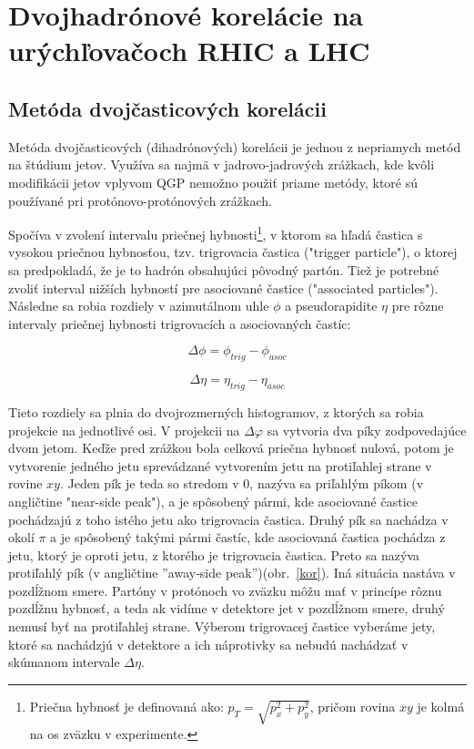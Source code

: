 \documentclass[thesismargins, thesislinespacing]{rnthesis}
\begin{document}
\chapter{Dvojhadrónové korelácie na urýchľovačoch RHIC a LHC}

\section{Metóda dvojčasticových korelácii}
Metóda dvojčasticových (dihadrónových) korelácii je jednou z nepriamych metód na štúdium jetov. Využíva sa najmä v jadrovo-jadrových zrážkach, kde kvôli \-mo\-di\-fi\-ká\-cii jetov vplyvom QGP nemožno použiť priame metódy, ktoré sú používané pri protónovo-protónových zrážkach.

Spočíva v zvolení intervalu priečnej hybnosti\footnote{Priečna hybnosť je definovaná ako: $p_T=\sqrt{p_x^2+p_y^2}$, pričom rovina $xy$ je kolmá na os zväzku v experimente.}, v ktorom sa hľadá častica s vysokou priečnou hybnosťou, tzv. trigrovacia častica ("trigger particle"), o ktorej sa predpokladá, že je to hadrón obsahujúci pôvodný partón. Tiež je potrebné zvoliť interval nižších hybností pre asociované častice ("\-associated particles"). Následne sa robia rozdiely v \-a\-zi\-mu\-tál\-nom uhle $\phi$ a pseudorapidite $\eta$ pre rôzne intervaly priečnej hybnosti trigrovacích a asociovaných častíc:

\begin{equation}
\Delta \phi = \phi_{trig} - \phi_{asoc}
\end{equation}

\begin{equation}
\Delta \eta = \eta_{trig} - \eta_{asoc}
\end{equation}

Tieto rozdiely sa plnia do dvojrozmerných histogramov, z ktorých sa robia projekcie na jednotlivé osi. V projekcii na $\Delta \varphi$ sa vytvoria dva píky zodpovedajúce dvom jetom. Keďže pred zrážkou bola celková priečna hybnosť nulová, potom je vytvorenie jedného jetu sprevádzané vytvorením jetu na protiľahlej strane v rovine $xy$. Jeden pík je teda so stredom v 0, nazýva sa priľahlým píkom (v angličtine "near-side peak"), a je spôsobený pármi, kde asociované častice pochádzajú z toho istého jetu ako trigrovacia častica. Druhý pík sa nachádza v okolí $\pi$ a je spôsobený takými pármi častíc, kde asociovaná častica pochádza z jetu, ktorý je oproti jetu, z ktorého je trigrovacia častica. Preto sa nazýva protiľahlý pík (v angličtine ''away-side peak'')(obr.~\ref{kor}). Iná situácia nastáva v pozdĺžnom smere. Partóny v protónoch vo zväzku môžu mať v princípe rôznu pozdĺžnu hybnosť, a teda ak vidíme v detektore jet v pozdĺžnom smere, druhý nemusí byť na protiľahlej strane. Výberom trigrovacej častice vyberáme jety, ktoré sa nachádzjú v detektore a ich náprotivky sa nebudú nachádzať v skúmanom intervale $\Delta \eta$.
\end{document}
